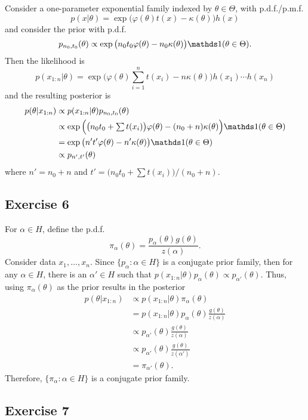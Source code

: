 \documentclass[12pt]{article}
\begin{document}
Consider a one-parameter exponential family indexed by $\theta\in\Theta$, with p.d.f./p.m.f.
$$ p(x|\theta) =\exp\big(\varphi(\theta) t(x)-\kappa(\theta)\big) h(x) $$
and consider the prior with p.d.f.
$$ p_{n_0,t_0}(\theta)\propto \exp\big(n_0 t_0 \varphi(\theta)-n_0\kappa(\theta)\big)\I(\theta\in\Theta). $$
Then the likelihood is
$$ p(x_{1:n}|\theta) =\exp\Big(\varphi(\theta)\sum_{i = 1}^n t(x_i)-n\kappa(\theta)\Big) h(x_1)\cdots h(x_n)$$
and the resulting posterior is
\begin{align*}
p(\theta|x_{1:n})&\propto p(x_{1:n}|\theta) p_{n_0,t_0}(\theta)\\
&\propto \exp\Big(\big(n_0 t_0 +\textstyle\sum t(x_i)\big)\varphi(\theta)-(n_0+ n)\kappa(\theta)\Big)\I(\theta\in\Theta)\\
& =\exp\big(n' t'\varphi(\theta)-n'\kappa(\theta)\big)\I(\theta\in\Theta)\\
&\propto p_{n',t'}(\theta)
\end{align*}
where $n'= n_0 + n$ and $t'=\big(n_0 t_0+\sum t(x_i)\big)/(n_0+ n)$.


\subsection*{Exercise 6}

For $\alpha\in H$, define the p.d.f.
$$\pi_\alpha(\theta) = \frac{p_\alpha(\theta) g(\theta)}{z(\alpha)}. $$
Consider data $x_1,\dotsc,x_n$. Since $\{p_\alpha:\alpha\in H\}$ is a conjugate prior family, then  for any $\alpha\in H$, there is an $\alpha'\in H$ such that $p(x_{1:n}|\theta) p_\alpha(\theta)\propto p_{\alpha'}(\theta)$.
Thus, using $\pi_\alpha(\theta)$ as the prior results in the posterior
\begin{align*}
p(\theta| x_{1:n}) &\propto p(x_{1:n}|\theta)\pi_\alpha(\theta)\\
& = p(x_{1:n}|\theta)p_\alpha(\theta) \frac{g(\theta)}{z(\alpha)}\\
&\propto p_{\alpha'}(\theta) \frac{g(\theta)}{z(\alpha)}\\
&\propto p_{\alpha'}(\theta) \frac{g(\theta)}{z(\alpha')}\\
&= \pi_{\alpha'}(\theta).
\end{align*}
Therefore, $\{\pi_\alpha:\alpha\in H\}$ is a conjugate prior family.


\subsection*{Exercise 7}
\end{document}
